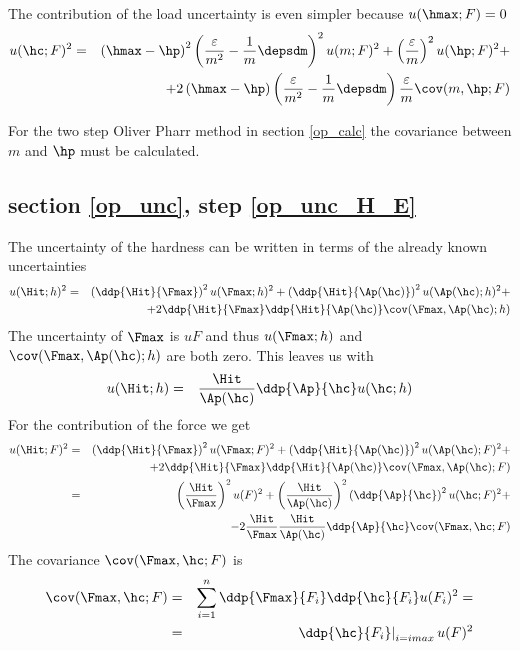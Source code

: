 The contribution of the load uncertainty is even simpler because $u(\hmax;F) =0 $
  \begin{eqnarray*}
u(\hc;F)^2 &=& 
   \left( \hmax - \hp \right)^2 \left( \frac{\varepsilon}{m^2} - \frac1m \depsdm \right)^2 u(m;F)^2 + 
  \left(\frac{\varepsilon }{m} \right)^2 u(\hp;F)^2 +
    \\  && + 2 \left( \hmax - \hp \right) \left( \frac{\varepsilon}{m^2} - \frac1m \depsdm \right) \frac{\varepsilon }{m}  \cov(m,\hp;F)   
  \end{eqnarray*}

For the two step Oliver Pharr method in section \ref{op_calc} the covariance between $m$ and $\hp$ must be calculated.
\subsection{section \ref{op_unc}, step \ref{op_unc_H_E}}
The uncertainty of the hardness can be written in terms of the already known uncertainties
\begin{eqnarray*}
 u(\Hit;h)^2 &=& 
 \left( \ddp{ \Hit}{ \Fmax}\right)^2 u(\Fmax;h)^2 + 
 \left( \ddp{ \Hit}{ \Ap(\hc)} \right)^2 u(\Ap(\hc);h)^2 + \\ 
  && + 2  \ddp{ \Hit}{ \Fmax}\ddp{ \Hit}{ \Ap(\hc)} \cov(\Fmax,\Ap(\hc);h)  
  \end{eqnarray*}
The uncertainty of $\Fmax$ is $uF$ and thus $u(\Fmax;h)$ and $\cov(\Fmax,\Ap(\hc);h) $ are both zero.
This leaves us with
\begin{eqnarray*} 
u(\Hit;h)&=& 
   \frac{\Hit}{\Ap(\hc)} \ddp{ \Ap}{ \hc} u(\hc;h)
\end{eqnarray*}
For the contribution of the force we get
\begin{eqnarray*}
 u(\Hit;F)^2 &=& 
 \left( \ddp{ \Hit}{ \Fmax}\right)^2 u(\Fmax;F)^2 + 
 \left( \ddp{ \Hit}{ \Ap(\hc)} \right)^2 u(\Ap(\hc);F)^2 + \\ 
  && + 2  \ddp{ \Hit}{ \Fmax}\ddp{ \Hit}{ \Ap(\hc)} \cov(\Fmax,\Ap(\hc);F) \\
  &=& 
 \left( \frac{\Hit}{ \Fmax}\right)^2 u(F)^2 + 
 \left( \frac{\Hit}{\Ap(\hc)} \right)^2 \left(\ddp{ \Ap}{ \hc}  \right)^2 u(\hc;F)^2 + \\ 
  && - 2  \frac{\Hit}{\Fmax}\frac{\Hit}{\Ap(\hc)} \ddp{ \Ap}{ \hc}  \cov(\Fmax,\hc;F)  
  \end{eqnarray*}
The covariance $\cov(\Fmax,\hc;F)$ is
\begin{eqnarray*}
 \cov(\Fmax,\hc;F) &=& \sum_{i=1}^n \ddp{ \Fmax}{ F_i} \ddp{ \hc}{ F_i} u(F_i)^2 = \\
 &=& \left. \ddp{ \hc}{ F_i} \right|_{i=imax} u(F)^2 
\end{eqnarray*}
